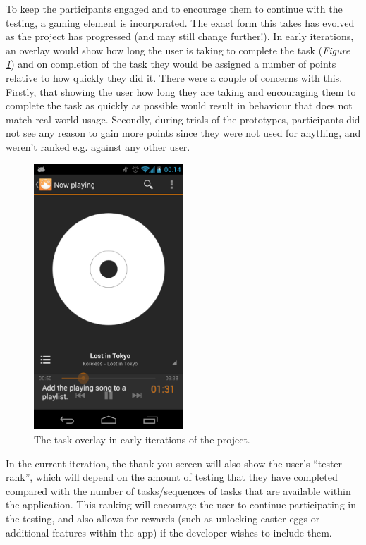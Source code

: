 To keep the participants engaged and to encourage them to continue with the testing, a gaming element is incorporated. The exact form this takes has evolved as the project has progressed (and may still change further!). In early iterations, an overlay would show how long the user is taking to complete the task (\emph{Figure \ref{fig:initial-overlay}}) and on completion of the task they would be assigned a number of points relative to how quickly they did it. There were a couple of concerns with this. Firstly, that showing the user how long they are taking and encouraging them to complete the task as quickly as possible would result in behaviour that does not match real world usage. Secondly, during trials of the prototypes, participants did not see any reason to gain more points since they were not used for anything, and weren't ranked e.g. against any other user.

\begin{figure}[ht!]
  \centering
  \includegraphics[width=0.5\textwidth]{images/time-taken}
  \caption{The task overlay in early iterations of the project.}
  \label{fig:initial-overlay}
\end{figure}

In the current iteration, the thank you screen will also show the user's ``tester rank'', which will depend on the amount of testing that they have completed compared with the number of tasks/sequences of tasks that are available within the application. This ranking will encourage the user to continue participating in the testing, and also allows for rewards (such as unlocking easter eggs or additional features within the app) if the developer wishes to include them.

